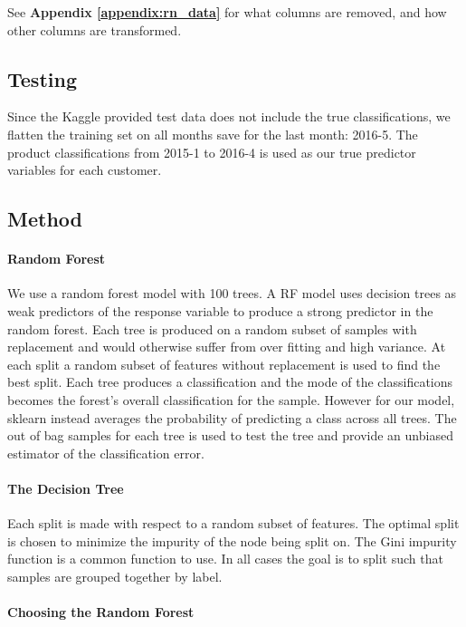 \documentclass{article}
\begin{document}
\begin{spacing}{1}
\begin{large}
See \textbf{Appendix \ref{appendix:rn_data}} for what columns are removed, and how other columns are transformed.


\subsection{Testing}
Since the Kaggle provided test data does not include the true classifications, we flatten the training set on all months save for the last month: 2016-5. The product classifications from 2015-1 to 2016-4 is used as our true predictor variables for each customer.

\subsection{Method}

\paragraph{Random Forest}
We use a random forest model with 100 trees. A RF model uses decision trees as weak predictors of the response variable to produce a strong predictor in the random forest. Each tree is produced on a random subset of samples with replacement and would otherwise suffer from over fitting and high variance. At each split a random subset of features without replacement is used to find the best split. Each tree produces a classification and the mode of the classifications becomes the forest's overall classification for the sample. However for our model, sklearn instead averages the probability of predicting a class across all trees.\cite{rnSKlearn}  The out of bag samples for each tree is used to test the tree and provide an unbiased estimator of the classification error.\cite{rnLeo} 

\paragraph{The Decision Tree}
Each split is made with respect to a random subset of features. The optimal split is chosen to minimize the impurity of the node being split on. The Gini impurity function is a common function to use. In all cases the goal is to split such that samples are grouped together by label.

\paragraph{Choosing the Random Forest}


\end{large}
\end{spacing}
\end{document}
